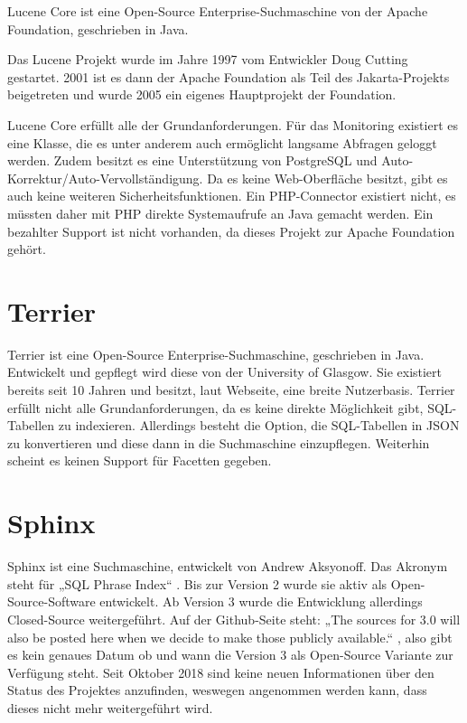 Lucene Core ist eine Open-Source Enterprise-Suchmaschine von der Apache Foundation, geschrieben in Java.

Das Lucene Projekt wurde im Jahre 1997 vom Entwickler Doug Cutting gestartet. 2001 ist es dann der Apache Foundation als Teil des Jakarta-Projekts beigetreten und wurde 2005 ein eigenes Hauptprojekt der Foundation. \cite{Wikipedia.2019c}

Lucene Core erfüllt alle der Grundanforderungen. Für das Monitoring existiert es eine Klasse, die es unter anderem auch ermöglicht langsame Abfragen geloggt werden. Zudem besitzt es eine Unterstützung von PostgreSQL und Auto-Korrektur/Auto-Vervollständigung. Da es keine Web-Oberfläche besitzt, gibt es auch keine weiteren Sicherheitsfunktionen. Ein PHP-Connector existiert nicht, es müssten daher mit PHP direkte Systemaufrufe an Java gemacht werden. Ein bezahlter Support ist nicht vorhanden, da dieses Projekt zur Apache Foundation gehört. \cite{TheApacheSoftwareFoundation.2019b}

\section{Terrier}
\label{terrier}

Terrier ist eine Open-Source Enterprise-Suchmaschine, geschrieben in Java. Entwickelt und gepflegt wird diese von der University of Glasgow. Sie existiert bereits seit 10 Jahren und besitzt, laut Webseite, eine breite Nutzerbasis. 
Terrier erfüllt nicht alle Grundanforderungen, da es keine direkte Möglichkeit gibt, SQL-Tabellen zu indexieren. Allerdings besteht die Option, die SQL-Tabellen in JSON zu konvertieren und diese dann in die Suchmaschine einzupflegen. Weiterhin scheint es keinen Support für Facetten gegeben.
\cite{McCreadie.2019}

\section{Sphinx}
\label{sphinx}

Sphinx ist eine Suchmaschine, entwickelt von Andrew Aksyonoff. Das Akronym steht für „SQL Phrase Index“ \cite{SphinxTechnologiesInc.b}. Bis zur Version 2 wurde sie aktiv als Open-Source-Software entwickelt. Ab Version 3 wurde die Entwicklung allerdings Closed-Source weitergeführt. Auf der Github-Seite steht: „The sources for 3.0 will also be posted here when we decide to make those publicly available.“ \cite{sphinxserach.2019}, also gibt es kein genaues Datum ob und wann die Version 3 als Open-Source Variante zur Verfügung steht. Seit Oktober 2018 sind keine neuen Informationen über den Status des Projektes anzufinden, weswegen angenommen werden kann, dass dieses nicht mehr weitergeführt wird.

